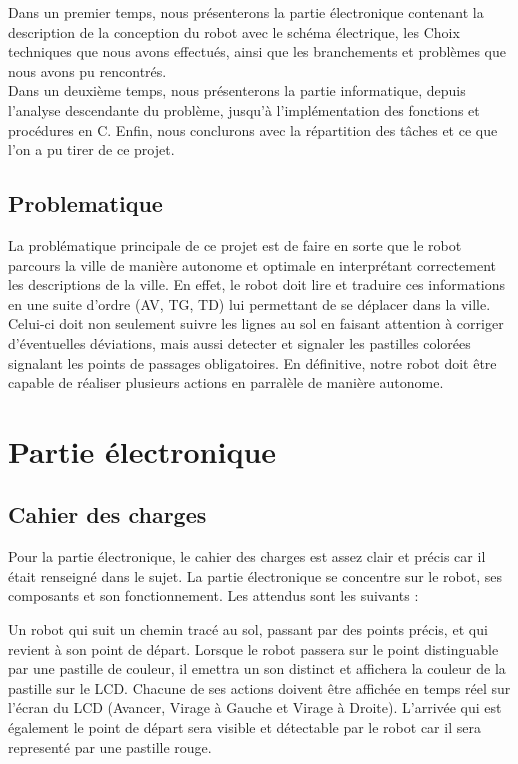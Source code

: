 \documentclass[11pt,a4paper]{article}
\begin{document}
Dans un premier temps, nous présenterons la partie électronique contenant la description de la conception du robot avec le schéma électrique, les Choix techniques que nous avons effectués, ainsi que les branchements et problèmes que nous avons pu rencontrés.\\
Dans un deuxième temps, nous présenterons la partie informatique, depuis l'analyse descendante du problème, jusqu'à l'implémentation des fonctions et procédures en C.
Enfin, nous conclurons avec la répartition des tâches et ce que l'on a pu tirer de ce projet.

\subsection{Problematique}
La problématique principale de ce projet est de faire en sorte que le robot parcours la ville de manière autonome et optimale en interprétant correctement les descriptions de la ville.
En effet, le robot doit lire et traduire ces informations en une suite d'ordre (AV, TG, TD) lui permettant de se déplacer dans la ville. 
Celui-ci doit non seulement suivre les lignes au sol en faisant attention à corriger d'éventuelles déviations, mais aussi detecter et signaler les pastilles colorées signalant les points de passages obligatoires.
En définitive, notre robot doit être capable de réaliser plusieurs actions en parralèle de manière autonome.

\section{Partie électronique}

\subsection{Cahier des charges}

Pour la partie électronique, le cahier des charges est assez clair et précis car il était renseigné dans le sujet. 
La partie électronique se concentre sur le robot, ses composants et son fonctionnement. Les attendus sont les suivants : 

Un robot qui suit un chemin tracé au sol, passant par des points précis, et qui revient à son point de départ. 
Lorsque le robot passera sur le point distinguable par une pastille de couleur, il emettra un son distinct et affichera la couleur de la pastille sur le LCD. 
Chacune de ses actions doivent être affichée en temps réel sur l'écran du LCD (Avancer, Virage à Gauche et Virage à Droite). 
L'arrivée qui est également le point de départ sera visible et détectable par le robot car il sera representé par une pastille rouge.
\end{document}
